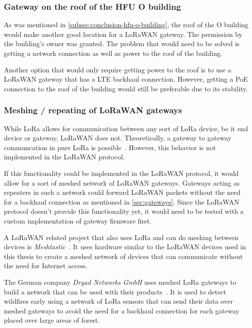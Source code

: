 \subsubsection{Gateway on the roof of the \acs{HFU} O building}

As was mentioned in \cref{subsec:conclusion-hfu-o-building}, the roof of the O building would make another good location for a \ac{LoRaWAN} gateway.
The permission by the building's owner was granted.
The problem that would need to be solved is getting a network connection as well as power to the roof of the building.

Another option that would only require getting power to the roof is to use a \ac{LoRaWAN} gateway that has a \ac{LTE} backhaul connection.
However, getting a \ac{PoE} connection to the roof of the building would still be preferable due to its stability.

\subsubsection{Meshing / repeating of \acs{LoRaWAN} gateways}

While \ac{LoRa} allows for communication between any sort of \ac{LoRa} device, be it end device or gateway, \ac{LoRaWAN} does not.
Theoretically, a gateway to gateway communcation in pure \ac{LoRa} is possible~\cite{dwijaksara_multihop_2019}.
However, this behavior is not implemented in the \ac{LoRaWAN} protocol.

If this functionality could be implemented in the \ac{LoRaWAN} protocol, it would allow for a sort of meshed network of \ac{LoRaWAN} gateways.
Gateways acting as repeaters in such a network could forward \ac{LoRaWAN} packets without the need for a backhaul connection as mentioned in \cref{sec:gateways}.
Since the \ac{LoRaWAN} protocol doesn't provide this functionality yet, it would need to be tested with a custom implementation of gateway firmware first.

A \ac{LoRaWAN} related project that also uses \ac{LoRa} and can do meshing between devices is \emph{Meshtastic}~\cite{meshtastic_llc_meshtastic_2023}.
It uses hardware similar to the \ac{LoRaWAN} devices used in this thesis to create a meshed network of devices that can communicate without the need for Internet access.

The German company \emph{Dryad Networks GmbH} uses meshed \ac{LoRa} gateways to build a network that can be used with their products~\cite{dryad_networks_gmbh_silvanet_2023}.
It is used to detect wildfires early using a network of \ac{LoRa} sensors that can send their data over meshed gateways to avoid the need for a backhaul connection for each gateway placed over large areas of forest.

